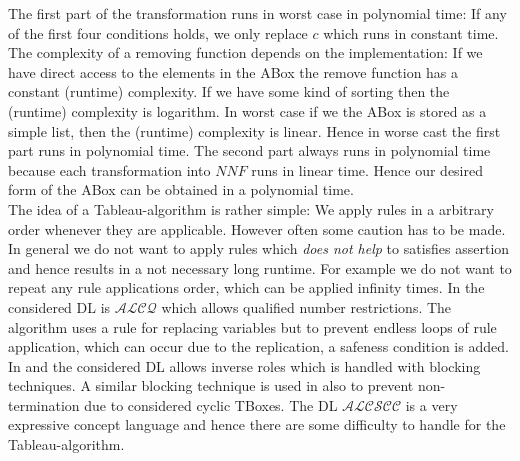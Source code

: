\documentclass[a4paper,11pt]{scrartcl}
\theoremstyle{break}
\theoremstyle{definition}
\begin{document}
The first part of the transformation runs in worst case in polynomial time: If any of the first four conditions holds, we only replace $c$ which runs in constant time.  The complexity of a removing function depends on the implementation: If we have direct access to the elements in the ABox the remove function has a constant (runtime) complexity. If we have some kind of sorting then the (runtime) complexity is logarithm. In worst case if we the ABox is stored as a simple list, then the (runtime) complexity is linear. Hence in worse cast the first part runs in polynomial time. The second part always runs in polynomial time because each transformation into $NNF$ runs in linear time. Hence our desired form of the ABox can be obtained in a polynomial time.\\
The idea of a Tableau-algorithm is rather simple: We apply rules in a arbitrary order whenever they are applicable. However often some caution has to be made. In general we do not want to apply rules which \textit{does not help} to satisfies assertion and hence results in a not necessary long runtime. For example we do not want to repeat any rule applications order, which can be applied infinity times. In \cite{1} the considered DL is $\mathcal{ALCQ}$ which allows qualified number restrictions. The algorithm uses a rule for replacing variables but to prevent endless loops of rule application, which can occur due to the replication, a safeness condition is added. In \cite{2} and\cite{6} the considered DL allows inverse roles which is handled with blocking techniques. A similar blocking technique is used in \cite{Ba} also to prevent non-termination due to considered cyclic TBoxes. The DL $\mathcal{ALCSCC}$ is a very expressive concept language and hence there are some difficulty to handle for the Tableau-algorithm.
\end{document}
